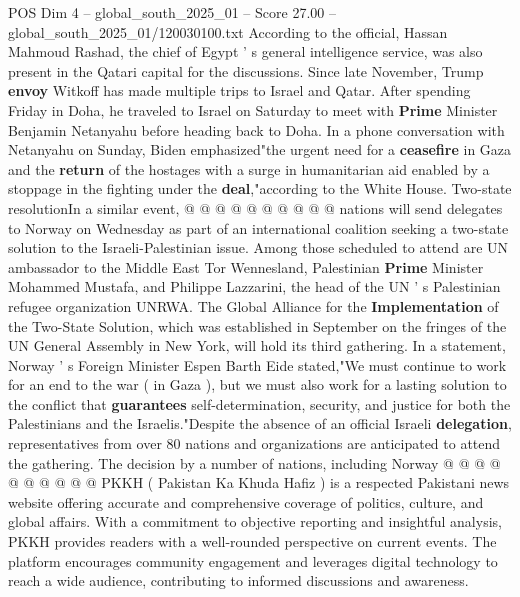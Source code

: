 \begin{textsample}{POS Dim 4 – global\_south\_2025\_01 – Score 27.00 – global\_south\_2025\_01/120030100.txt}
According to the official, Hassan Mahmoud Rashad, the chief of Egypt ' s general intelligence service, was also present in the Qatari capital for the discussions.
Since late November, Trump \textbf{envoy} Witkoff has made multiple trips to Israel and Qatar.
After spending Friday in Doha, he traveled to Israel on Saturday to meet with \textbf{Prime} Minister Benjamin Netanyahu before heading back to Doha.
In a phone conversation with Netanyahu on Sunday, Biden emphasized"the urgent need for a \textbf{ceasefire} in Gaza and the \textbf{return} of the hostages with a surge in humanitarian aid enabled by a stoppage in the fighting under the \textbf{deal},"according to the White House.
Two-state resolutionIn a similar event, @ @ @ @ @ @ @ @ @ @ nations will send delegates to Norway on Wednesday as part of an international coalition seeking a two-state solution to the Israeli-Palestinian issue.
Among those scheduled to attend are UN ambassador to the Middle East Tor Wennesland, Palestinian \textbf{Prime} Minister Mohammed Mustafa, and Philippe Lazzarini, the head of the UN ' s Palestinian refugee organization UNRWA.
The Global Alliance for the \textbf{Implementation} of the Two-State Solution, which was established in September on the fringes of the UN General Assembly in New York, will hold its third gathering.
In a statement, Norway ' s Foreign Minister Espen Barth Eide stated,"We must continue to work for an end to the war ( in Gaza ), but we must also work for a lasting solution to the conflict that \textbf{guarantees} self-determination, security, and justice for both the Palestinians and the Israelis."Despite the absence of an official Israeli \textbf{delegation}, representatives from over 80 nations and organizations are anticipated to attend the gathering.
The decision by a number of nations, including Norway @ @ @ @ @ @ @ @ @ @ PKKH ( Pakistan Ka Khuda Hafiz ) is a respected Pakistani news website offering accurate and comprehensive coverage of politics, culture, and global affairs.
With a commitment to objective reporting and insightful analysis, PKKH provides readers with a well-rounded perspective on current events.
The platform encourages community engagement and leverages digital technology to reach a wide audience, contributing to informed discussions and awareness.

\end{textsample}
